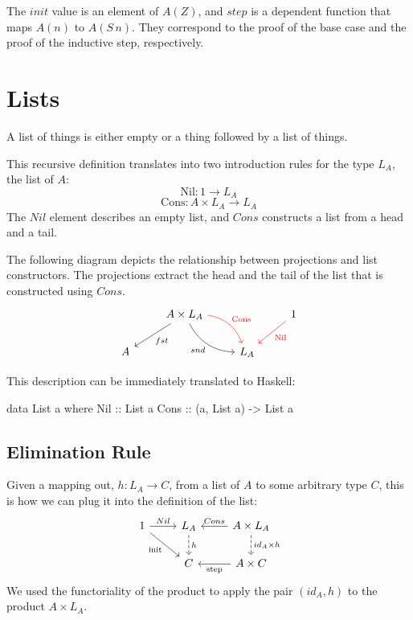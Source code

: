 \documentclass[DaoFP]{subfiles}
\begin{document}
The $init$ value is an element of $A(Z)$, and $step$ is a dependent function that maps $A(n)$ to $A(S\, n)$. They correspond to the proof of the base case and the proof of the inductive step, respectively.

\section{Lists}

A list of things is either empty or a thing followed by a list of things. 

This recursive definition translates into two introduction rules for the type $L_A$, the list of $A$: 
\[ \text{Nil} \colon 1 \to L_A \]
\[ \text{Cons} \colon A \times L_A \to L_A \]
The $Nil$ element describes an empty list, and $Cons$ constructs a list from a head and a tail. 

The following diagram depicts the relationship between projections and list constructors. The projections extract the head and the tail of the list that is constructed using $Cons$.
\[
 \begin{tikzcd}
 & A \times L_A
 \arrow[ld, "fst"]
 \arrow[rd, bend right, "snd"']
 \arrow[rd, bend left, red, "\text{Cons}"]
 && 1
 \arrow[ld, red, "\text{Nil}"]
 \\
 A
&&L_A
  \end{tikzcd}
\]

This description can be immediately translated to Haskell:
\begin{haskell}
data List a where
  Nil  :: List a
  Cons :: (a, List a) -> List a
\end{haskell}



\subsection{Elimination Rule}

Given a mapping out, $h \colon L_A \to C$, from a list of $A$ to some arbitrary type $C$, this is how we can plug it into the definition of the list:
\[
 \begin{tikzcd}
 1
 \arrow[r, "Nil"]
 \arrow[rd, "\text{init}"']
 &L_A
\arrow[d, dashed, "h"]
&A \times L_A
  \arrow[l, "Cons"']
\arrow[d, dashed, "id_A \times h"]
\\
& C
& A \times C
\arrow[l, "\text{step}"]
  \end{tikzcd}
\]
We used the functoriality of the product to apply the pair $(id_A, h)$ to the product $A \times L_A$.
\end{document}
